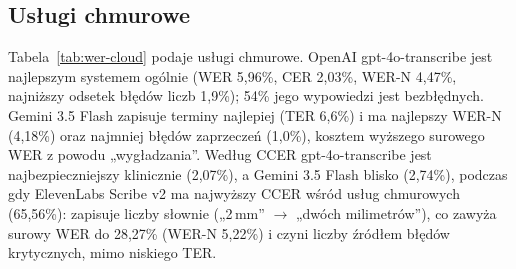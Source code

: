 \documentclass[conference]{IEEEtran}
\begin{document}
\subsection{Usługi chmurowe}
Tabela~\ref{tab:wer-cloud} podaje usługi chmurowe. OpenAI gpt-4o-transcribe jest najlepszym systemem ogólnie (WER 5,96\%, CER 2,03\%, WER-N 4,47\%, najniższy odsetek błędów liczb 1,9\%); 54\% jego wypowiedzi jest bezbłędnych. Gemini 3.5 Flash zapisuje terminy najlepiej (TER 6,6\%) i ma najlepszy WER-N (4,18\%) oraz najmniej błędów zaprzeczeń (1,0\%), kosztem wyższego surowego WER z powodu „wygładzania''. Według CCER gpt-4o-transcribe jest najbezpieczniejszy klinicznie (2,07\%), a Gemini 3.5 Flash blisko (2,74\%), podczas gdy ElevenLabs Scribe v2 ma najwyższy CCER wśród usług chmurowych (65,56\%): zapisuje liczby słownie („2\,mm'' $\to$ „dwóch milimetrów''), co zawyża surowy WER do 28,27\% (WER-N 5,22\%) i czyni liczby źródłem błędów krytycznych, mimo niskiego TER.

\begin{table}[t]
\centering
\caption{Usługi chmurowe (online). Kolumny jak w Tabeli~\ref{tab:wer-open}; RTF obejmuje sieć i kolejkę i nie jest porównywalny z modelami lokalnymi.}
\label{tab:wer-cloud}
\end{table}
\end{document}
